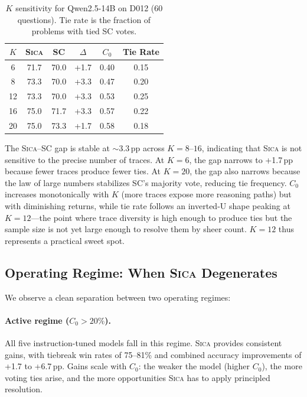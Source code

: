 \documentclass[11pt,a4paper]{article}
\newcommand{\sica}{\textsc{Sica}}
\newcommand{\czero}{C_0}
\begin{document}
\begin{table}[t]
\centering
\caption{$K$ sensitivity for Qwen2.5-14B on D012 (60 questions). Tie rate is the fraction of problems with tied SC votes.}
\label{tab:ksens}
\small
\begin{tabular}{@{}c cc cc c@{}}
\toprule
$K$ & \sica{} & SC & $\Delta$ & $\czero{}$ & Tie Rate \\
\midrule
6  & 71.7 & 70.0 & +1.7 & 0.40 & 0.15 \\
8  & 73.3 & 70.0 & +3.3 & 0.47 & 0.20 \\
12 & 73.3 & 70.0 & +3.3 & 0.53 & 0.25 \\
16 & 75.0 & 71.7 & +3.3 & 0.57 & 0.22 \\
20 & 75.0 & 73.3 & +1.7 & 0.58 & 0.18 \\
\bottomrule
\end{tabular}
\end{table}

The \sica{}--SC gap is stable at ${\sim}3.3$\,pp across $K{=}8$--$16$, indicating that \sica{} is not sensitive to the precise number of traces.
At $K{=}6$, the gap narrows to +1.7\,pp because fewer traces produce fewer ties.
At $K{=}20$, the gap also narrows because the law of large numbers stabilizes SC's majority vote, reducing tie frequency.
$\czero{}$ increases monotonically with $K$ (more traces expose more reasoning paths) but with diminishing returns, while tie rate follows an inverted-U shape peaking at $K{=}12$---the point where trace diversity is high enough to produce ties but the sample size is not yet large enough to resolve them by sheer count.
$K{=}12$ thus represents a practical sweet spot.


\subsection{Operating Regime: When \sica{} Degenerates}
\label{sec:regime}

We observe a clean separation between two operating regimes:

\paragraph{Active regime ($\czero{}>20\%$).}
All five instruction-tuned models fall in this regime.
\sica{} provides consistent gains, with tiebreak win rates of 75--81\% and combined accuracy improvements of +1.7 to +6.7\,pp.
Gains scale with $\czero{}$: the weaker the model (higher $\czero{}$), the more voting ties arise, and the more opportunities \sica{} has to apply principled resolution.
\end{document}
